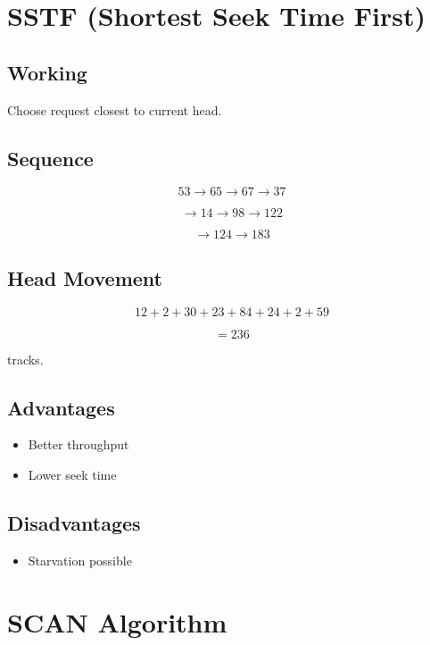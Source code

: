 \section{SSTF (Shortest Seek Time First)}

\subsection{Working}

Choose request closest to current head.

\subsection{Sequence}

\[
53 \rightarrow 65 \rightarrow 67 \rightarrow 37
\]

\[
\rightarrow 14 \rightarrow 98 \rightarrow 122
\]

\[
\rightarrow 124 \rightarrow 183
\]

\subsection{Head Movement}

\[
12+2+30+23+84+24+2+59
\]

\[
=236
\]

tracks.

\subsection{Advantages}

\begin{itemize}
\item Better throughput
\item Lower seek time
\end{itemize}

\subsection{Disadvantages}

\begin{itemize}
\item Starvation possible
\end{itemize}

\section{SCAN Algorithm}

